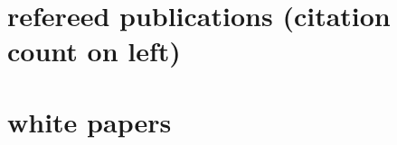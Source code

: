 \documentclass[]{luger-cv} %
\begin{document}
\header




%
\section{refereed publications {\footnotesize \normalfont (citation count on left)} }
%
\begin{list}{}{\pubslist}
    
\end{list}
%
\vspace{1em}

\section{white papers}
%                                                                                                                                                  
\begin{list}{}{\pubslist}
    
\end{list}
%                                                                                                                                                  
\vspace{1em}
\end{document}
